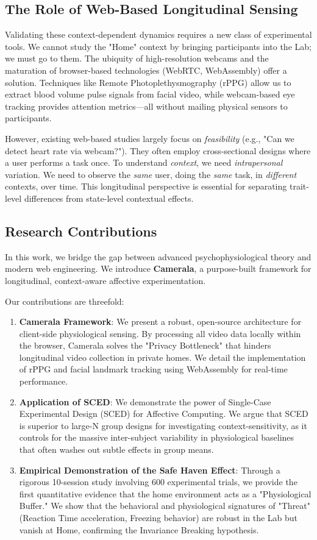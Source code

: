 \documentclass[journal]{IEEEtran}
\begin{document}
\subsection{The Role of Web-Based Longitudinal Sensing}
Validating these context-dependent dynamics requires a new class of experimental tools. We cannot study the "Home" context by bringing participants into the Lab; we must go to them.
The ubiquity of high-resolution webcams and the maturation of browser-based technologies (WebRTC, WebAssembly) offer a solution. Techniques like Remote Photoplethysmography (rPPG) \cite{mcduff_rppg} allow us to extract blood volume pulse signals from facial video, while webcam-based eye tracking \cite{webgazer} provides attention metrics—all without mailing physical sensors to participants.

However, existing web-based studies largely focus on \textit{feasibility} (e.g., "Can we detect heart rate via webcam?"). They often employ cross-sectional designs where a user performs a task once. To understand \textit{context}, we need \textit{intrapersonal} variation. We need to observe the \textit{same} user, doing the \textit{same} task, in \textit{different} contexts, over time. This longitudinal perspective is essential for separating trait-level differences from state-level contextual effects.

\subsection{Research Contributions}
In this work, we bridge the gap between advanced psychophysiological theory and modern web engineering. We introduce \textbf{Camerala}, a purpose-built framework for longitudinal, context-aware affective experimentation.

Our contributions are threefold:
\begin{enumerate}
    \item \textbf{Camerala Framework}: We present a robust, open-source architecture for client-side physiological sensing. By processing all video data locally within the browser, Camerala solves the "Privacy Bottleneck" that hinders longitudinal video collection in private homes. We detail the implementation of rPPG and facial landmark tracking using WebAssembly for real-time performance.
    \item \textbf{Application of SCED}: We demonstrate the power of Single-Case Experimental Design (SCED) \cite{barlow_sced} for Affective Computing. We argue that SCED is superior to large-N group designs for investigating context-sensitivity, as it controls for the massive inter-subject variability in physiological baselines that often washes out subtle effects in group means.
    \item \textbf{Empirical Demonstration of the Safe Haven Effect}: Through a rigorous 10-session study involving 600 experimental trials, we provide the first quantitative evidence that the home environment acts as a "Physiological Buffer." We show that the behavioral and physiological signatures of "Threat" (Reaction Time acceleration, Freezing behavior) are robust in the Lab but vanish at Home, confirming the Invariance Breaking hypothesis.
\end{enumerate}
\end{document}

